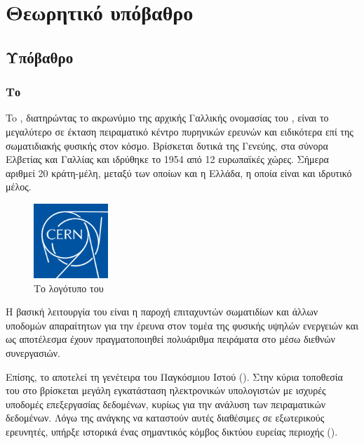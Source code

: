 \chapter{Θεωρητικό υπόβαθρο}

\section{Υπόβαθρο}
\subsection{Το }

To , διατηρώντας το ακρωνύμιο της αρχικής Γαλλικής ονομασίας του , είναι το μεγαλύτερο σε έκταση πειραματικό κέντρο πυρηνικών ερευνών και ειδικότερα επί της σωματιδιακής φυσικής στον κόσμο. 
Βρίσκεται δυτικά της Γενεύης, στα σύνορα Ελβετίας και Γαλλίας και ιδρύθηκε το 1954 από 12 ευρωπαϊκές χώρες. 
Σήμερα αριθμεί 20 κράτη-μέλη, μεταξύ των οποίων και η Ελλάδα, η οποία είναι και ιδρυτικό μέλος.

\begin{figure}[tph]
\includegraphics[width=0.25\textwidth]{images/CERNlogo.png}
\centering
\caption{Το λογότυπο του }
\label{img:CERNlogo}
\end{figure}

Η βασική λειτουργία του  είναι η παροχή επιταχυντών σωματιδίων και άλλων υποδομών απαραίτητων για την έρευνα στον τομέα της φυσικής υψηλών ενεργειών και ως αποτέλεσμα έχουν πραγματοποιηθεί πολυάριθμα πειράματα στο  μέσω διεθνών συνεργασιών.

Επίσης, το  αποτελεί τη γενέτειρα του Παγκόσμιου Ιστού ().
Στην κύρια τοποθεσία του στο  βρίσκεται μεγάλη εγκατάσταση ηλεκτρονικών υπολογιστών με ισχυρές υποδομές επεξεργασίας δεδομένων, κυρίως για την ανάλυση των πειραματικών δεδομένων. 
Λόγω της ανάγκης να καταστούν αυτές διαθέσιμες σε εξωτερικούς ερευνητές, υπήρξε ιστορικά ένας σημαντικός κόμβος δικτύου ευρείας περιοχής ().

